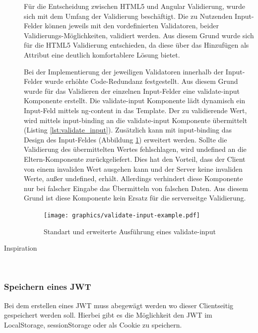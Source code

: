 \begin{description}
	Für die Entscheidung zwischen \gls{HTML}5 und Angular Validierung, wurde sich mit dem Umfang der Validierung beschäftigt. Die zu Nutzenden Input-Felder können jeweils mit den vordefinierten Validatoren, beider Validierungs-Möglichkeiten, validiert werden. Aus diesem Grund wurde sich für die \gls{HTML}5 Validierung entschieden, da diese über das Hinzufügen als Attribut eine deutlich komfortablere Lösung bietet. 
	
	Bei der Implementierung der jeweiligen Validatoren innerhalb der Input-Felder wurde erhöhte Code-Redundanz festgestellt. Aus diesem Grund wurde für das Validieren der einzelnen Input-Felder eine validate-input Komponente erstellt. Die validate-input Komponente lädt dynamisch ein Input-Feld mittels ng-content in das Template. Der zu validierende Wert, wird mittels input-binding an die validate-input Komponente übermittelt (Listing \ref{lst:validate_input}). Zusätzlich kann mit input-binding das Design des Input-Feldes (Abbildung \ref{fig:validate_input}) erweitert werden. Sollte die Validierung des übermittelten Wertes fehlschlagen, wird undefined an die Eltern-Komponente zurückgeliefert. Dies hat den Vorteil, dass der Client von einem invaliden Wert ausgehen kann und der Server keine invaliden Werte, außer undefined, erhält. Allerdings verhindert diese Komponente nur bei falscher Eingabe das Übermitteln von falschen Daten. Aus diesem Grund ist diese Komponente kein Ersatz für die serverseitge Validierung. 
	
	\begin{figure}
		\centering
		\texttt{[image: graphics/validate-input-example.pdf]}
		\caption{Standart und erweiterte Ausführung eines validate-input}
		\label{fig:validate_input}
	\end{figure}
	
	\begin{minipage}{\linewidth}
			
	\end{minipage}

	
	\item[Inspiration]\hfill\\
\end{description}

\subsubsection{Speichern eines \gls{JWT}}
Bei dem erstellen eines \gls{JWT} muss abegewägt werden wo dieser Clientseitig gespeichert werden soll. Hierbei gibt es die Möglichkeit den \gls{JWT} im LocalStorage, sessionStorage oder als Cookie zu speichern.

